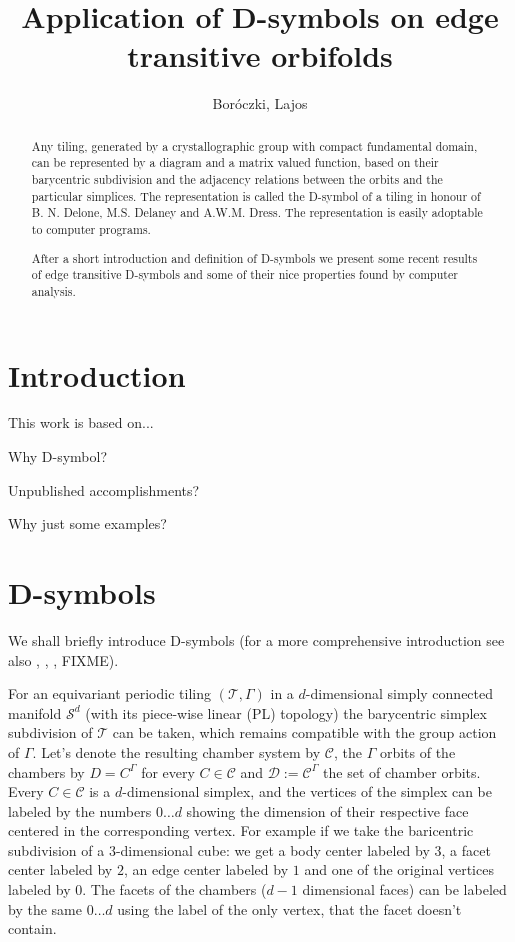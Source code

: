 \documentclass[12pt,a4paper]{article}
\theoremstyle{plain}%
\theoremstyle{definition}
\theoremstyle{remark}
\begin{document}
\title{Application of D-symbols on edge transitive orbifolds}
\author{Boróczki, Lajos}
\maketitle

\begin{abstract}
  Any tiling, generated by a crystallographic group with compact fundamental
  domain, can be represented by a diagram and a matrix valued function, based on
  their barycentric subdivision and the adjacency relations between the orbits
  and the particular simplices. The representation is called the D-symbol of a
  tiling in honour of B. N. Delone, M.S. Delaney and A.W.M. Dress. The
  representation is easily adoptable to computer programs.

  After a short introduction and definition of D-symbols we 
  present some recent results of edge transitive D-symbols and some of their
  nice properties found by computer analysis.
\end{abstract}

\section{Introduction}
This work is based on...

Why D-symbol?

Unpublished accomplishments?

Why just some examples?

\section{D-symbols}
We shall briefly introduce D-symbols (for a more comprehensive introduction see
also \cite{BSzK02}, \cite{DHM93}, \cite{M96}, FIXME). 

For an equivariant periodic tiling $(\mathcal{T},\Gamma)$ in a $d$-dimensional simply
connected manifold $\mathcal{S}^d$ (with its piece-wise linear (PL) topology) the barycentric simplex subdivision of $\mathcal{T}$
can be taken, which remains compatible with the group action of $\Gamma$. Let's denote
the resulting chamber system by $\mathcal{C}$, the $\Gamma$ orbits of the
chambers by $D=C^\Gamma$ for every $C\in \mathcal{C}$ and $\mathcal{D}:=
\mathcal{C}^\Gamma$ the set of chamber orbits. Every $C\in \mathcal{C}$
is a $d$-dimensional simplex, and the vertices of the simplex can be labeled by
the numbers $0\ldots d$ showing the dimension of their respective face centered
in the corresponding vertex. For
example if we take the baricentric subdivision of a $3$-dimensional cube: we get
a body center labeled by $3$, a facet center labeled by $2$, an edge center
labeled by $1$ and one of the original vertices labeled by $0$. The facets
of the chambers ($d-1$ dimensional faces) can be labeled by the same $0\ldots d$
using the label of the only vertex, that the facet doesn't contain.
\end{document}
